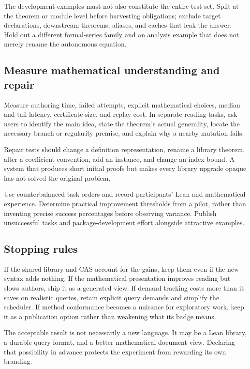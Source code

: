 \documentclass[11pt,a4paper]{article}
\theoremstyle{definition}
\begin{document}
The development examples must not also constitute the entire test set. Split at the theorem or module level before harvesting obligations; exclude target declarations, downstream theorems, aliases, and caches that leak the answer. Hold out a different formal-series family and an analysis example that does not merely rename the autonomous equation.

\subsection{Measure mathematical understanding and repair}
Measure authoring time, failed attempts, explicit mathematical choices, median and tail latency, certificate size, and replay cost. In separate reading tasks, ask users to identify the main idea, state the theorem's actual generality, locate the necessary branch or regularity premise, and explain why a nearby mutation fails.

Repair tests should change a definition representation, rename a library theorem, alter a coefficient convention, add an instance, and change an index bound. A system that produces short initial proofs but makes every library upgrade opaque has not solved the original problem.

Use counterbalanced task orders and record participants' Lean and mathematical experience. Determine practical improvement thresholds from a pilot, rather than inventing precise success percentages before observing variance. Publish unsuccessful tasks and package-development effort alongside attractive examples.

\subsection{Stopping rules}
If the shared library and CAS account for the gains, keep them even if the new syntax adds nothing. If the mathematical presentation improves reading but slows authors, ship it as a generated view. If demand tracking costs more than it saves on realistic queries, retain explicit query demands and simplify the scheduler. If method conformance becomes a nuisance for exploratory work, keep it as a publication option rather than weakening what its badge means.

The acceptable result is not necessarily a new language. It may be a Lean library, a durable query format, and a better mathematical document view. Declaring that possibility in advance protects the experiment from rewarding its own branding.
\end{document}
